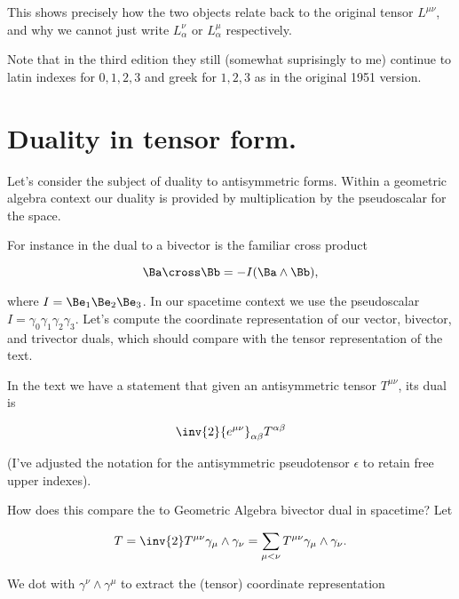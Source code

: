 This shows precisely how the two objects relate back to the original tensor $L^{\mu \nu}$, and why we cannot just write $L_\alpha^\nu$ or $L^\mu_\alpha$ respectively.

Note that in the third edition they still (somewhat suprisingly to me) continue to latin indexes for $0,1,2,3$ and greek for $1,2,3$ as in the original 1951 version.

\section{Duality in tensor form.}

Let's consider the subject of duality to antisymmetric forms.  Within a geometric algebra context our duality is provided by multiplication by the pseudoscalar for the space.

For instance in  the dual to a bivector is the familiar cross product

\begin{equation}\label{eqn:antisymmetricTensorTx:500}
\Ba \cross \Bb = -I (\Ba \wedge \Bb),
\end{equation}

where $I = \Be_1 \Be_2 \Be_3$.  In our spacetime context we use the pseudoscalar $I = \gamma_0 \gamma_1 \gamma_2 \gamma_3$.  Let's compute the coordinate representation of our vector, bivector, and trivector duals, which should compare with the tensor representation of the text.

In the text we have a statement that given an antisymmetric tensor $T^{\mu \nu}$, its dual is

\begin{equation}\label{eqn:antisymmetricTensorTx:510}
\inv{2} {e^{\mu \nu}}_{\alpha \beta} T^{\alpha \beta}
\end{equation}

(I've adjusted the notation for the antisymmetric pseudotensor $\epsilon$ to retain free upper indexes).

How does this compare the to Geometric Algebra bivector dual in spacetime?  Let

\begin{equation}\label{eqn:antisymmetricTensorTx:520}
T = \inv{2} T^{\mu \nu} \gamma_\mu \wedge \gamma_\nu 
= \sum_{\mu < \nu} T^{\mu \nu} \gamma_\mu \wedge \gamma_\nu.
\end{equation}

We dot with $\gamma^\nu \wedge \gamma^\mu$ to extract the (tensor) coordinate representation

